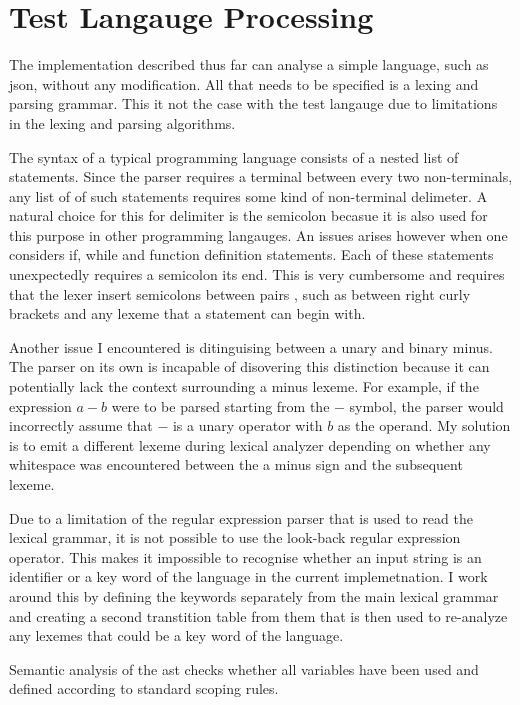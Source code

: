 \section{Test Langauge Processing} \label{test_lang}

The implementation described thus far can analyse a simple language, such as \gls{json}, without any
modification. All that needs to be specified is a lexing and parsing grammar. This it not the case
with the test langauge due to limitations in the lexing and parsing algorithms.

The syntax of a typical programming language consists of a nested list of statements. Since the
parser requires a terminal between every two non-terminals, any list of of such statements requires
some kind of non-terminal delimeter. A natural choice for this for delimiter is the semicolon
becasue it is also used for this purpose in other programming langauges. An issues arises however
when one considers if, while and function definition statements. Each of these statements unexpectedly requires a semicolon its end. This is very cumbersome and requires that the lexer insert semicolons between pairs , such as between right curly brackets and any lexeme that a statement can begin with.

Another issue I encountered is ditinguising between a unary and binary minus. The parser on
its own is incapable of disovering this distinction because it can potentially lack the context
surrounding a minus lexeme. For example, if the expression $a - b$ were to be parsed starting from
the $-$ symbol, the parser would incorrectly assume that $-$ is a unary operator with $b$ as the
operand. My solution is to emit a different lexeme during lexical analyzer depending on whether any
whitespace was encountered between the a minus sign and the subsequent lexeme.

Due to a limitation of the regular expression parser that is used to read the lexical grammar,
it is not possible to use the look-back regular expression operator. This makes it impossible to
recognise whether an input string is an identifier or a key word of the language in the current
implemetnation. I work around this by defining the keywords separately from the main lexical grammar
and creating a second transtition table from them that is then used to re-analyze any lexemes that
could be a key word of the language.

Semantic analysis of the \gls{ast} checks whether all variables have been used and defined according
to standard scoping rules.

